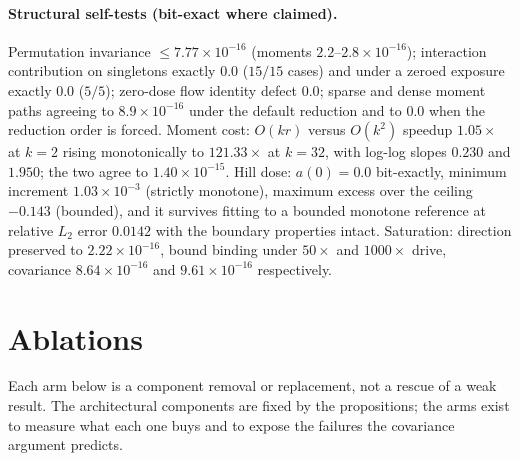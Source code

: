 \documentclass{article}
\begin{document}
\paragraph{Structural self-tests (bit-exact where claimed).} Permutation invariance
$\le 7.77\times10^{-16}$ (moments $2.2$--$2.8\times10^{-16}$); interaction contribution on
singletons exactly $0.0$ ($15/15$ cases) and under a zeroed exposure exactly $0.0$ ($5/5$);
zero-dose flow identity defect $0.0$; sparse and dense moment paths agreeing to
$8.9\times10^{-16}$ under the default reduction and to $0.0$ when the reduction order is
forced. Moment cost: $O(kr)$ versus $O(k^{2})$ speedup $1.05\times$ at $k{=}2$ rising
monotonically to $\mathbf{121.33\times}$ at $k{=}32$, with log-log slopes $0.230$ and
$1.950$; the two agree to $1.40\times10^{-15}$. Hill dose: $a(0) = 0.0$ bit-exactly, minimum
increment $1.03\times10^{-3}$ (strictly monotone), maximum excess over the ceiling
$-0.143$ (bounded), and it survives fitting to a bounded monotone reference at relative
$L_{2}$ error $0.0142$ with the boundary properties intact. Saturation: direction preserved
to $2.22\times10^{-16}$, bound binding under $50\times$ and $1000\times$ drive, covariance
$8.64\times10^{-16}$ and $9.61\times10^{-16}$ respectively.

\section{Ablations}
\label{app:ablations}

Each arm below is a component removal or replacement, not a rescue of a weak result. The
architectural components are fixed by the propositions; the arms exist to measure what each
one buys and to expose the failures the covariance argument predicts.
\end{document}

